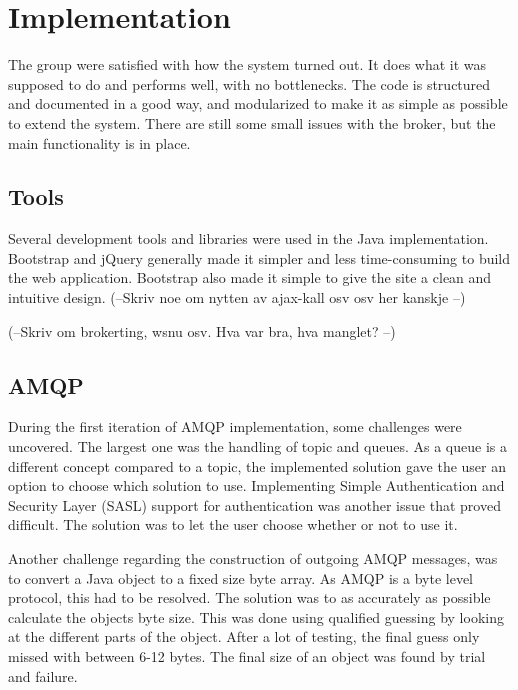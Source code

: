 \section{Implementation}
\label{sec:Implementation}

The group were satisfied with how the system turned out. It does what it was supposed to do and performs well, with no bottlenecks. The code is structured and documented in a good way, and modularized to make it as simple as possible to extend the system. There are still some small issues with the broker, but the main functionality is in place. 

\subsection{Tools}

Several development tools and libraries were used in the Java implementation. Bootstrap and jQuery generally made it simpler and less time-consuming to build the web application. Bootstrap also made it simple to give the site a clean and intuitive design. (--Skriv noe om nytten av ajax-kall osv osv her kanskje --)

(--Skriv om brokerting, wsnu osv. Hva var bra, hva manglet? --)

\subsection{AMQP}
\label{subsec:Implementation_AMQP}

During the first iteration of AMQP implementation, some challenges were uncovered. The largest one was the handling of topic and queues. As a queue is a different concept compared to a topic, the implemented solution gave the user an option to choose which solution to use. Implementing Simple Authentication and Security Layer (SASL) support for authentication was another issue that proved difficult. The solution was to let the user choose whether or not to use it.

Another challenge regarding the construction of outgoing AMQP messages, was to convert a Java object to a fixed size byte array. As AMQP is a byte level protocol, this had to be resolved. The solution was to as accurately as possible calculate the objects byte size. This was done using qualified guessing by looking at the different parts of the object. After a lot of testing, the final guess only missed with between 6-12 bytes. The final size of an object was found by trial and failure.

